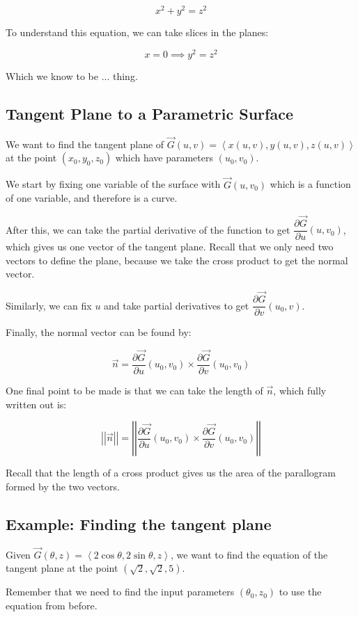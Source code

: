 \documentclass{article}
\newcommand{\norm}[1]{\left|\left|#1\right|\right|}
\begin{document}
\[
x^2 + y^2 = z^2
\]

To understand this equation, we can take slices in the planes:

\[
x=0 \implies y^2 = z^2
\]

Which we know to be ... thing.

\subsection*{Tangent Plane to a Parametric Surface}

We want to find the tangent plane of $\vec{G}(u,v) = \left<x(u,v), y(u,v), z(u,v)\right>$ at the point $(x_0, y_0, z_0)$ which have parameters $(u_0, v_0)$.

We start by fixing one variable of the surface with $\vec{G}(u,v_0)$ which is a function of one variable, and therefore is a curve.

After this, we can take the partial derivative of the function to get $\dfrac{\partial \vec{G}}{\partial u}(u, v_0)$, which gives us one vector of the tangent plane. Recall that we only need two vectors to define the plane, because we take the cross product to get the normal vector.

Similarly, we can fix $u$ and take partial derivatives to get $\dfrac{\partial \vec{G}}{\partial v}(u_0, v)$.

Finally, the normal vector can be found by:

\[
\vec{n} = \dfrac{\partial \vec{G}}{\partial u}(u_0, v_0) \times \dfrac{\partial \vec{G}}{\partial v}(u_0, v_0)
\]

One final point to be made is that we can take the length of $\vec{n}$, which fully written out is:

\[
\norm{\vec{n}} = \norm{\dfrac{\partial \vec{G}}{\partial u}(u_0, v_0) \times \dfrac{\partial \vec{G}}{\partial v}(u_0, v_0)}
\]

Recall that the length of a cross product gives us the area of the parallogram formed by the two vectors.

\subsection*{Example: Finding the tangent plane}

Given $\vec{G}(\theta, z) = \left<2 \cos{\theta}, 2\sin{\theta}, z\right>$, we want to find the equation of the tangent plane at the point $\left(\sqrt{2}, \sqrt{2}, 5\right)$.

Remember that we need to find the input parameters $(\theta_0, z_0)$ to use the equation from before.
\end{document}
